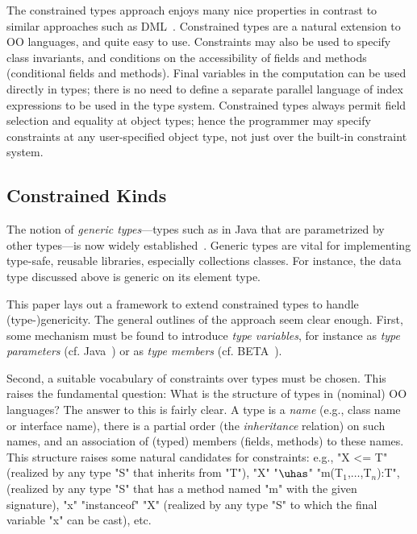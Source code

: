 The constrained types approach enjoys many nice properties in contrast
to similar approaches such as DML~\cite{xi99dependent}.  Constrained
types are a natural extension to OO languages, and quite easy to
use. Constraints may also be used to specify class invariants, and
conditions on the accessibility of fields and methods (conditional
fields and methods).  Final variables in the computation can be used
directly in types; there is no need to define a separate
parallel language of index expressions to be used in the type system.
Constrained types always
permit field selection and equality at object types; hence the
programmer may specify constraints at any user-specified object type,
not just over the built-in constraint system.  

\subsection{Constrained Kinds}
The notion of \emph{generic types}---types such as  in
Java that are parametrized by other types---is now widely
established~\cite{clu,ada,GJ,java-popl97,thorup97,Java3,csharp-generics}.
Generic types are vital for implementing type-safe, reusable
libraries, especially collections classes.  For instance, the data
type  discussed above is generic on its element type.

This paper lays out a framework to extend constrained types to handle
(type-)genericity. The general outlines of the approach seem clear
enough. First, some mechanism must be found to introduce {\em type
variables}, for instance as {\em type parameters} (cf.
Java~\cite{Java3}) or as
{\em type members} (cf. BETA~\cite{beta}). 

Second, a suitable vocabulary of constraints over types must be
chosen. This raises the fundamental question: What is the structure of
types in (nominal) OO languages?  The answer to this is fairly
clear. A type is a {\em name} (e.g., class name or interface name),
there is a partial order (the {\em inheritance} relation) on such
names, and an association of (typed) members (fields, methods) to
these names. This structure raises some natural candidates for
constraints: e.g., \xcd"X <= T" (realized by any type \xcd"S" that
inherits from \xcd"T"), \xcd"X" \xcdmath"$\uhas$"
\xcdmath"m(T$_1$,$\ldots$,T$_n$):T", (realized by
any type \xcd"S" that has a method named \xcd"m" with the given
signature), \xcd"x" \xcd"instanceof" \xcd"X" (realized by any type
\xcd"S" to which the final variable 
\xcd"x" can be cast), etc. 

